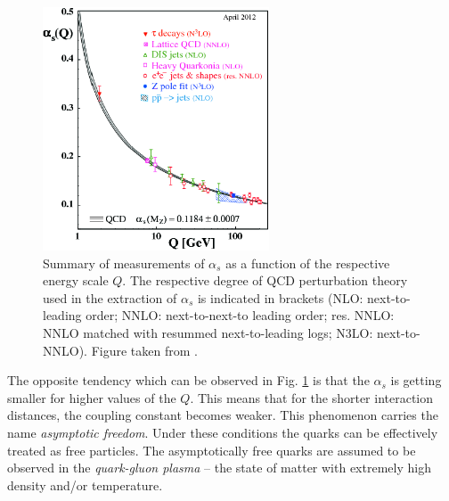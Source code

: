 \begin{figure}[t]
  \centering
  \includegraphics[width=0.6\textwidth]{01_Theory_SM/plots/Alpha_s.png}
  \caption{Summary of measurements of $\alpha_s$ as a function of the respective energy scale $Q$. The respective degree of QCD perturbation 
  theory used in the extraction of $\alpha_{s}$ is indicated in brackets (NLO: next-to-leading order; NNLO: next-to-next-to leading order; 
  res. NNLO: NNLO matched with resummed next-to-leading logs; N3LO: next-to-NNLO). Figure taken from \cite{PDG-2012}.}
  \label{fig:Alpha_s}
\end{figure}

The opposite tendency which can be observed in Fig. \ref{fig:Alpha_s} is that the $\alpha_{s}$ is getting smaller for higher values 
of the $Q$. This means that for the shorter interaction distances, the coupling constant becomes weaker. This phenomenon carries the 
name \textit{asymptotic freedom}\cite{PhysRevLett.30.1343}. Under these conditions the quarks can be effectively treated as free particles. The asymptotically 
free quarks are assumed to be observed in the \textit{quark-gluon plasma} \cite{Bohr1977275} -- the state of matter with extremely high density and/or temperature.



